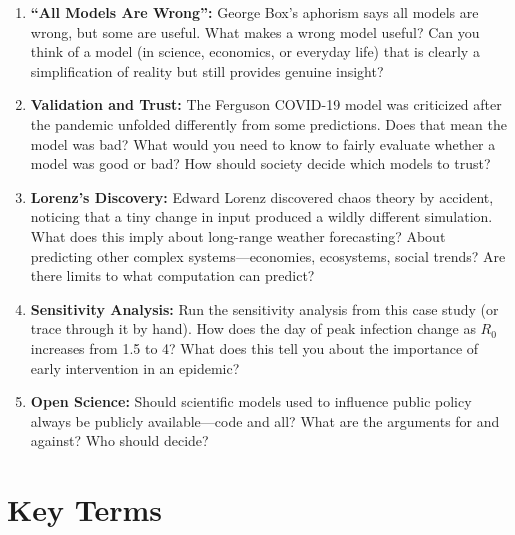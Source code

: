 \documentclass[11pt,letterpaper]{article}
\begin{document}
\begin{questionbox}
\begin{enumerate}[leftmargin=*, label=\textcolor{cswarm}{\textbf{\arabic*.}}]
    \item \textbf{``All Models Are Wrong'':} George Box's aphorism says all models are wrong, but some are useful. What makes a wrong model useful? Can you think of a model (in science, economics, or everyday life) that is clearly a simplification of reality but still provides genuine insight?

    \item \textbf{Validation and Trust:} The Ferguson COVID-19 model was criticized after the pandemic unfolded differently from some predictions. Does that mean the model was bad? What would you need to know to fairly evaluate whether a model was good or bad? How should society decide which models to trust?

    \item \textbf{Lorenz's Discovery:} Edward Lorenz discovered chaos theory by accident, noticing that a tiny change in input produced a wildly different simulation. What does this imply about long-range weather forecasting? About predicting other complex systems---economies, ecosystems, social trends? Are there limits to what computation can predict?

    \item \textbf{Sensitivity Analysis:} Run the sensitivity analysis from this case study (or trace through it by hand). How does the day of peak infection change as $R_0$ increases from 1.5 to 4? What does this tell you about the importance of early intervention in an epidemic?

    \item \textbf{Open Science:} Should scientific models used to influence public policy always be publicly available---code and all? What are the arguments for and against? Who should decide?
\end{enumerate}
\end{questionbox}

\section*{Key Terms}
\end{document}
